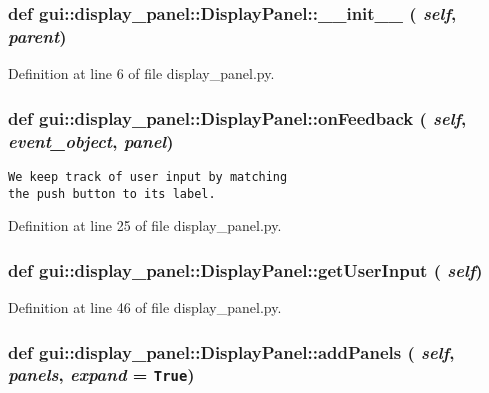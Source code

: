 \subsubsection{\setlength{\rightskip}{0pt plus 5cm}def gui::display\_\-panel::DisplayPanel::\_\-\_\-init\_\-\_\- ( {\em self},  {\em parent})}\label{classgui_1_1display__panel_1_1DisplayPanel_f04da04ae79a9a008bd6b495a61ac7b1}




Definition at line 6 of file display\_\-panel.py.
\subsubsection{\setlength{\rightskip}{0pt plus 5cm}def gui::display\_\-panel::DisplayPanel::onFeedback ( {\em self},  {\em event\_\-object},  {\em panel})}\label{classgui_1_1display__panel_1_1DisplayPanel_e42a8fdc78847c635b6581707f906416}




\footnotesize\begin{verbatim}
We keep track of user input by matching
the push button to its label.
\end{verbatim}
\normalsize
 

Definition at line 25 of file display\_\-panel.py.
\subsubsection{\setlength{\rightskip}{0pt plus 5cm}def gui::display\_\-panel::DisplayPanel::getUserInput ( {\em self})}\label{classgui_1_1display__panel_1_1DisplayPanel_055bd2098cf6261c59b2e095caae9ea9}




Definition at line 46 of file display\_\-panel.py.
\subsubsection{\setlength{\rightskip}{0pt plus 5cm}def gui::display\_\-panel::DisplayPanel::addPanels ( {\em self},  {\em panels},  {\em expand} = {\tt True})}\label{classgui_1_1display__panel_1_1DisplayPanel_130d536e32dcafa2f81210988ce292cf}




